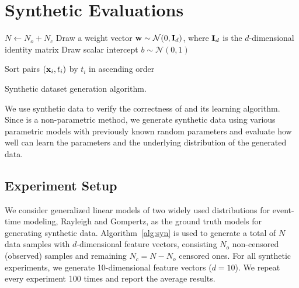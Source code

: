 \section{Synthetic Evaluations}\label{sec:synthetic}

\begin{algorithm}[t]
	\small
	\SetAlgoLined
	$N\leftarrow N_o+N_c$\;
	Draw a weight vector $\mathbf{w}\sim\mathcal{N}(0,\mathbf{I}_d)$, where $\mathbf{I}_d$ is the $d$-dimensional identity matrix\;
	Draw scalar intercept $b\sim\mathcal{N}(0,1)$\;
	
	Sort pairs $(\mathbf{x}_i,t_i)$ by $t_i$ in ascending order\;
	
	\caption{Synthetic dataset generation algorithm.}
	\label{alg:syn}
\end{algorithm}

We use synthetic data to verify the correctness of \npglm and its learning algorithm. Since \npglm is a non-parametric method, we generate synthetic data using various parametric models with previously known random parameters and evaluate how well \npglm can learn the parameters and the underlying distribution of the generated data.

\subsection{Experiment Setup}
We consider generalized linear models of two widely used distributions for event-time modeling, Rayleigh and Gompertz, as the ground truth models for generating synthetic data. Algorithm~\ref{alg:syn} is used to generate a total of $N$ data samples with $d$-dimensional feature vectors, consisting $N_o$ non-censored (observed) samples and remaining $N_c=N-N_o$ censored ones. For all synthetic experiments, we generate 10-dimensional feature vectors ($d=10$). We repeat every experiment 100 times and report the average results.

